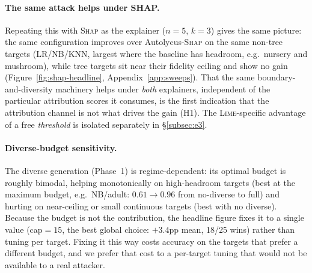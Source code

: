 \documentclass[sigconf,anonymous,review]{acmart}
\begin{document}
\paragraph{The same attack helps under SHAP.}
Repeating this with \textsc{Shap} as the explainer ($n{=}5$, $k{=}3$) gives the same picture: the
same configuration improves over Autolycus-\textsc{Shap} on the same non-tree targets (LR/NB/KNN,
largest where the baseline has headroom, e.g.\ nursery and mushroom), while tree targets sit near
their fidelity ceiling and show no gain (Figure~\ref{fig:shap-headline}, Appendix~\ref{app:sweeps}).
That the same boundary-and-diversity machinery helps under \emph{both} explainers, independent of the particular attribution scores it consumes, is the first indication that the attribution channel is
not what drives the gain (H1). The \textsc{Lime}-specific advantage of a free \emph{threshold} is
isolated separately in \S\ref{subsec:e3}.

\paragraph{Diverse-budget sensitivity.}
The diverse generation (Phase~1) is regime-dependent: its optimal budget is roughly bimodal,
helping monotonically on high-headroom targets (best at the maximum budget, e.g.\ NB/adult:
$0.61{\to}0.96$ from no-diverse to full) and hurting on near-ceiling or small continuous targets
(best with no diverse). Because the budget is not the contribution, the headline figure fixes it
to a single value (cap${=}15$, the best global choice: $+3.4$pp mean, 18/25 wins) rather than
tuning per target. Fixing it this way costs accuracy on the targets that prefer a different budget,
and we prefer that cost to a per-target tuning that would not be available to a real attacker.
\end{document}
